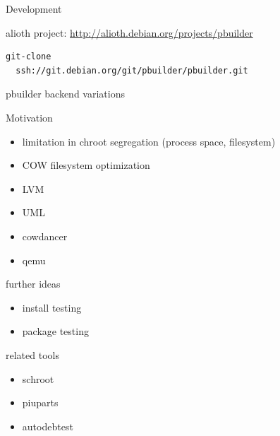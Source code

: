 \documentclass[dvipdfm,12pt]{beamer}
\begin{document}
\begin{frame}[containsverbatim]{Development}

alioth project: \url{http://alioth.debian.org/projects/pbuilder}

\begin{verbatim}
git-clone
  ssh://git.debian.org/git/pbuilder/pbuilder.git
\end{verbatim}
\end{frame}

\begin{frame}{pbuilder backend variations}
\begin{minipage}{0.5\hsize}
 Motivation
\begin{itemize}
 \item limitation in chroot segregation (process space, filesystem)
 \item COW filesystem optimization
\end{itemize}
\end{minipage}\begin{minipage}{0.4\hsize}
  \begin{itemize}
  \item LVM
  \item UML
  \item cowdancer
  \item qemu
 \end{itemize}
\end{minipage}
\end{frame}

\begin{frame}{further ideas}
 \begin{itemize}
  \item install testing
  \item package testing
 \end{itemize}
\end{frame}

\begin{frame}{related tools}
 \begin{itemize}
  \item schroot
  \item piuparts
  \item autodebtest
 \end{itemize}
\end{frame}
\end{document}
